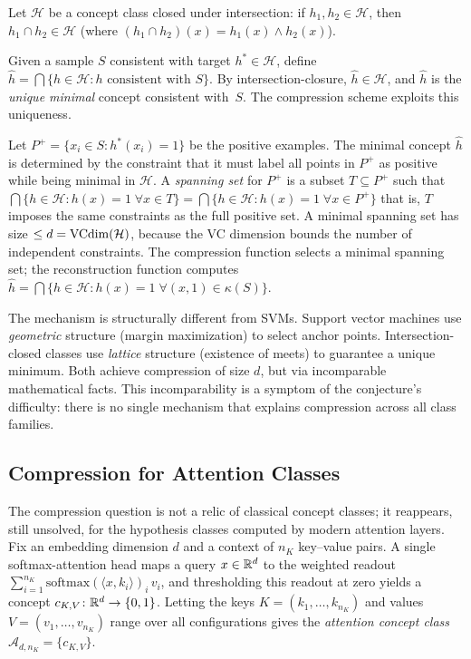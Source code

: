 \begin{example}
\label{ex:intersection-closed-compression}
Let $\mathcal{H}$ be a concept class closed under intersection: if
$h_1, h_2 \in \mathcal{H}$, then $h_1 \cap h_2 \in \mathcal{H}$
(where $(h_1 \cap h_2)(x) = h_1(x) \wedge h_2(x)$).

Given a sample $S$ consistent with target $h^* \in \mathcal{H}$,
define
$\hat{h} = \bigcap\{h \in \mathcal{H} : h \text{ consistent with } S\}$.
By intersection-closure, $\hat{h} \in \mathcal{H}$, and $\hat{h}$ is
the \emph{unique minimal} concept consistent with~$S$.  The
compression scheme exploits this uniqueness.

Let $P^+ = \{x_i \in S : h^*(x_i) = 1\}$ be the positive examples.
The minimal concept $\hat{h}$ is determined by the constraint that it
must label all points in $P^+$ as positive while being minimal in
$\mathcal{H}$.  A \emph{spanning set} for $P^+$ is a subset
$T \subseteq P^+$ such that
$\bigcap\{h \in \mathcal{H} : h(x) = 1\;\forall x \in T\}
 = \bigcap\{h \in \mathcal{H} : h(x) = 1\;\forall x \in P^+\}$%
that is, $T$ imposes the same constraints as the full positive set.
A minimal spanning set has size $\leq d = \mathrm{VCdim}(\mathcal{H})$, because
the VC dimension bounds the number of independent constraints.  The
compression function selects a minimal spanning set; the
reconstruction function computes
$\hat{h} = \bigcap\{h \in \mathcal{H} : h(x) = 1\;\forall (x, 1) \in
\kappa(S)\}$.

The mechanism is structurally different from SVMs.  Support vector
machines use \emph{geometric} structure (margin maximization) to
select anchor points.  Intersection-closed classes use \emph{lattice}
structure (existence of meets) to guarantee a unique minimum.  Both
achieve compression of size $d$, but via incomparable mathematical
facts.  This incomparability is a symptom of the conjecture's
difficulty: there is no single mechanism that explains compression
across all class families.
\end{example}


\subsection{Compression for Attention Classes}
\label{sec:attention-compression}

The compression question is not a relic of classical concept classes; it
reappears, still unsolved, for the hypothesis classes computed by modern
attention layers.  Fix an embedding dimension $d$ and a context of $n_K$
key--value pairs.  A single softmax-attention head maps a query $x \in \mathbb{R}^d$ to
the weighted readout
$\sum_{i=1}^{n_K} \mathrm{softmax}(\langle x, k_i\rangle)_i\, v_i$, and
thresholding this readout at zero yields a concept
$c_{K,V}\colon \mathbb{R}^d \to \{0,1\}$.  Letting the keys $K = (k_1, \ldots, k_{n_K})$
and values $V = (v_1, \ldots, v_{n_K})$ range over all configurations gives the
\emph{attention concept class} $\mathcal{A}_{d,n_K} = \{c_{K,V}\}$.

